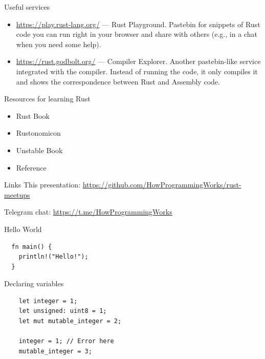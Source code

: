 \documentclass[12pt, aspectratio=169]{beamer}
\begin{document}
\begin{frame}{Useful services}
  \begin{itemize}
    \item \url{https://play.rust-lang.org/} --- Rust Playground. Pastebin for
      snippets of Rust code you can run right in your browser and share with
      others (e.g., in a chat when you need some help).
    \item \url{https://rust.godbolt.org/} --- Compiler Explorer. Another
      pastebin-like service integrated with the compiler. Instead of running
      the code, it only compiles it and shows the correspondence between Rust
      and Assembly code.
  \end{itemize}
\end{frame}

\begin{frame}{Resources for learning Rust}
  \begin{itemize}
    \item Rust Book 
    \item Rustonomicon 
    \item Unstable Book 
    \item Reference 
  \end{itemize}
\end{frame}

\begin{frame}{Links}
  This presentation: \url{https://github.com/HowProgrammingWorks/rust-meetups}

  Telegram chat: \url{https://t.me/HowProgrammingWorks}
\end{frame}

\begin{frame}[fragile]{Hello World}
  \begin{verbatim}
  fn main() {
    println!("Hello!");
  }
  \end{verbatim}
\end{frame}

\begin{frame}[fragile]{Declaring variables}
  \begin{verbatim}
    let integer = 1;
    let unsigned: uint8 = 1;
    let mut mutable_integer = 2;

    integer = 1; // Error here
    mutable_integer = 3;
  \end{verbatim}
\end{frame}
\end{document}
